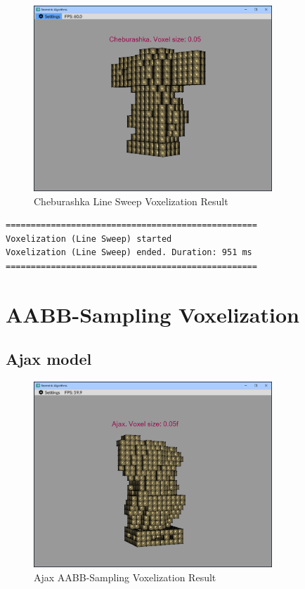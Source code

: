\documentclass[12pt,a4paper,english]{article}
\begin{document}
\begin{figure}[H]
    \centering
    \includegraphics[width=0.8\textwidth]{p3-2-cheburashka-line-sweep}
    \caption[]{Cheburashka Line Sweep Voxelization Result}
    \label{fig:p3-2-cheburashka-line-sweep}
\end{figure}

\begin{verbatim}
==================================================
Voxelization (Line Sweep) started
Voxelization (Line Sweep) ended. Duration: 951 ms
==================================================
\end{verbatim}

\section{AABB-Sampling Voxelization}

\subsection{Ajax model}

\begin{figure}[H]
    \centering
    \includegraphics[width=0.8\textwidth]{p3-3-ajax-aabb-sampling}
    \caption[]{Ajax AABB-Sampling Voxelization Result}
    \label{fig:p3-3-ajax-aabb-sampling}
\end{figure}
\end{document}
